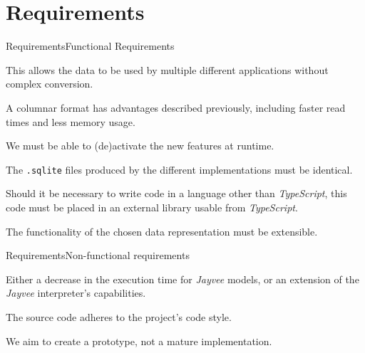 \section{Requirements}
\begin{frame}[t]{Requirements}{Functional Requirements}
	\begin{description}[<+(1)->]
		\item[interoperability] This allows the data to be used by multiple different applications without complex conversion. %
		\item[columnar] A columnar format has advantages described previously, including faster read times and less memory usage.
		\item[feature toggle] We must be able to (de)activate the new features at runtime.
		\item[compatibility] The \Verb|.sqlite| files produced by the different implementations must be identical.
		\item[modularization] Should it be necessary to write code in a language other than \emph{TypeScript}, this code must be placed in an external library usable from \emph{TypeScript}.
		\item[extensibility] The functionality of the chosen data representation must be extensible.
	\end{description}
\end{frame}
\begin{frame}[t]{Requirements}{Non-functional requirements}
	\begin{description}[<+(1)->]
		\item[performance] Either a decrease in the execution time for \emph{Jayvee} models, or an extension of the \emph{Jayvee} interpreter's capabilities.
		\item[code style] The source code adheres to the project's code style.
		\item[maturity] We aim to create a prototype, not a mature implementation.
	\end{description}
\end{frame}

